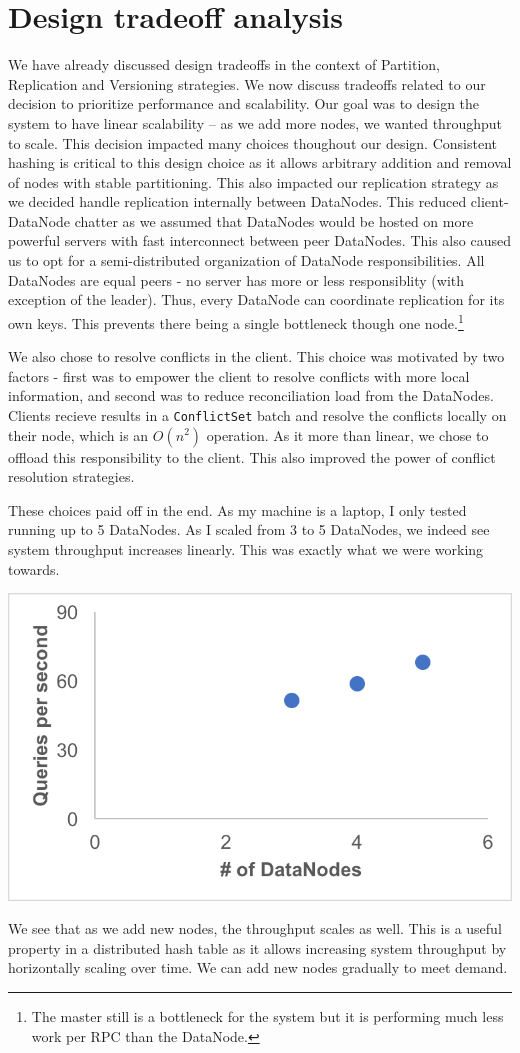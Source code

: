 \documentclass[paper=a4,fontsize=11pt]{report} %
\numberwithin{equation}{section} %
\numberwithin{figure}{section} %
\numberwithin{table}{section} %
\begin{document}
\section{Design tradeoff analysis}
We have already discussed design tradeoffs in the context of Partition, Replication and Versioning strategies. We now discuss tradeoffs related to our decision to prioritize performance and scalability. Our goal was to design the system to have linear scalability -- as we add more nodes, we wanted throughput to scale. This decision impacted many choices thoughout our design. Consistent hashing is critical to this design choice as it allows arbitrary addition and removal of nodes with stable partitioning. This also impacted our replication strategy as we decided handle replication internally between DataNodes. This reduced client-DataNode chatter as we assumed that DataNodes would be hosted on more powerful servers with fast interconnect between peer DataNodes. This also caused us to opt for a semi-distributed organization of DataNode responsibilities. All DataNodes are equal peers - no server has more or less responsiblity (with exception of the leader). Thus, every DataNode can coordinate replication for its own keys. This prevents there being a single bottleneck though one node.\footnote{The master still is a bottleneck for the system but it is performing much less work per RPC than the DataNode.}

We also chose to resolve conflicts in the client. This choice was motivated by two factors - first was to empower the client to resolve conflicts with more local information, and second was to reduce reconciliation load from the DataNodes. Clients recieve results in a \texttt{ConflictSet} batch and resolve the conflicts locally on their node, which is an $O(n^2)$ operation. As it more than linear, we chose to offload this responsibility to the client. This also improved the power of conflict resolution
strategies.

These choices paid off in the end. As my machine is a laptop, I only tested running up to 5 DataNodes. As I scaled from 3 to 5 DataNodes, we indeed see system throughput increases linearly. This was exactly what we were working towards.

\noindent\includegraphics[width=.65\textwidth]{LinearScaling.png}

We see that as we add new nodes, the throughput scales as well. This is a useful property in a distributed hash table as it allows increasing system throughput by horizontally scaling over time. We can add new nodes gradually to meet demand.
\end{document}
